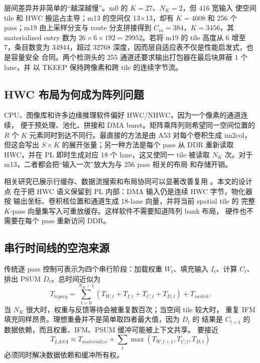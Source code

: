 

层间差异并非简单的“越深越慢”。m0 的 $K=27$、$N_K=2$，但 416 宽输入
使空间 tile 和 HWC 搬运占主导；m13 的空间仅 13$\times$13，却有
$K=4608$ 和 256 个 pass；m19 由上采样分支与 route 分支拼接得到
$C_{in}=384$，$K=3456$，其 materialized entry 数为
$26\times6\times192=29952$。若将 m19 的 tile 高度从 6 增至 7，条目数变为
34944，超过 32768 深度，因而层自适应表不仅是性能启发式，也是容量安全
合同。两个检测头的 255 通道还要求输出打包器在最后块屏蔽 1 个 lane，并
以 TKEEP 保持跨像素和跨 tile 的连续字节流。

\subsection{HWC 布局为何成为阵列问题}

CPU、图像库和许多边缘推理软件偏好 HWC/NHWC，因为一个像素的通道连续，
便于预处理、池化、拼接和 DMA burst。矩阵乘阵列则希望同一空间位置的
$R$ 个 $K$ 元素同时到达不同行。最直接的方法是由 A53 对每个卷积生成
im2col，但这会写出 $S\times K$ 的展开张量；另一种方法是每个 pass 从 DDR
重新读取 HWC，并在 PL 即时生成对应 18 个 lane，这又使同一 tile 被读取
$N_K$ 次。对于 m13，二者都会把“输入一次”放大为与 256 pass 相关的布局
和存储开销。

相关研究已展示行缓存、数据流搜索和布局协同可以显著改善复用
\cite{fpgaConvNet2015,dnnweaver2018,snowflake2017,feather2024}。本文的设计点
在于把 HWC 语义保留到 PL 内部：DMA 输入仍是连续 HWC 字节，物化器按
输出坐标、卷积核位置和通道生成 18-lane 向量，并将当前 spatial tile 的
完整 $K$-pass 向量集写入可重放缓存。这样软件不需要知道阵列 bank 布局，
硬件也不需要在每个 pass 重新访问 DDR。

\subsection{串行时间线的空泡来源}

传统逐 pass 控制可表示为四个串行阶段：加载权重 $W_t$、填充输入
$I_t$、计算 $C_t$、排出 PSUM $D_t$。总时间近似为
\begin{equation}
T_{legacy}=\sum_{t=0}^{N_K-1}(T_{W,t}+T_{I,t}+T_{C,t}+T_{D,t})+T_{switch}.
\end{equation}
当 $N_K$ 很大时，权重与反馈等待会被重复数百次；当空间 tile 较大时，
重复 IFM 填充同样昂贵。理想重叠并不是简单取四者最大值，因为 $D_t$ 的
结果是 $C_{t+1}$ 的数据依赖，而且权重、IFM、PSUM 缓冲可能被上下文共享。
要接近
\begin{equation}
T_{LASA}\approx T_{materialize}+\sum_t\max(T_{W,t+1},T_{C,t},T_{D,t})
\end{equation}
必须同时解决数据依赖和缓冲所有权。


